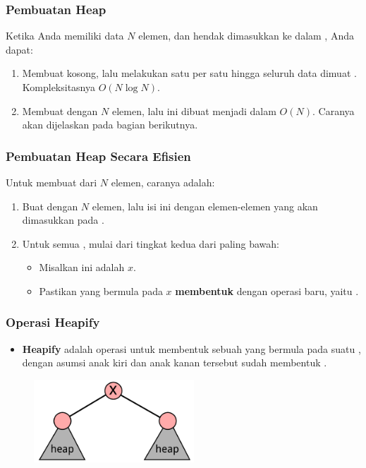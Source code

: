 \begin{frame}
\frametitle{Pembuatan Heap}
Ketika Anda memiliki data $N$ elemen, dan hendak dimasukkan ke dalam \pheap, Anda dapat:
\begin{enumerate}
  \item Membuat \pheap kosong, lalu melakukan  satu per satu hingga seluruh data dimuat \pheap. Kompleksitasnya $O(N \log{N})$.
  \item Membuat \farray dengan $N$ elemen, lalu \farray ini dibuat menjadi \pheap dalam $O(N)$. Caranya akan dijelaskan pada bagian berikutnya.
\end{enumerate}
\end{frame}

\begin{frame}
\frametitle{Pembuatan Heap Secara Efisien}
Untuk membuat \pheap dari $N$ elemen, caranya adalah:
\begin{enumerate}
  \item Buat \farray dengan $N$ elemen, lalu isi \farray ini dengan elemen-elemen yang akan dimasukkan pada \pheap.
  \item Untuk semua \fnode, mulai dari tingkat kedua dari paling bawah:
  \begin{itemize}
    \item Misalkan \fnode ini adalah \fnode $x$.
    \item Pastikan \fsubtree yang bermula pada \fnode $x$ \textbf{membentuk \pheap} dengan operasi baru, yaitu .
  \end{itemize}
\end{enumerate}
\end{frame}

\begin{frame}
\frametitle{Operasi Heapify}
\begin{itemize}
  \item \textbf{Heapify} adalah operasi untuk membentuk sebuah \pheap yang bermula pada suatu \fnode, dengan asumsi anak kiri dan anak kanan \fnode tersebut sudah membentuk \pheap.
\end{itemize}
\begin{figure}
  \includegraphics[width=6cm]{asset/heapify.pdf}
\end{figure}
\end{frame}

